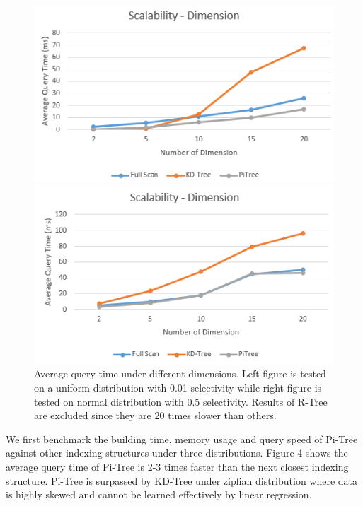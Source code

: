 \documentclass[sigconf,10pt]{acmart}
\begin{document}
\begin{figure}[t] 
  \label{scalability-dimension} 
  \begin{minipage}[b]{0.45\linewidth}
    \centering
    \includegraphics[width=.8\linewidth]{../figures/scalability/dimension-random} 
    \vspace{4ex}
  \end{minipage}%
  \begin{minipage}[b]{0.45\linewidth}
    \centering
    \includegraphics[width=.8\linewidth]{../figures/scalability/dimension-normal} 
    \vspace{4ex}
  \end{minipage}%
  \caption{Average query time under different dimensions. Left figure is tested
  on a uniform distribution with 0.01 selectivity while right figure is tested on normal distribution
  with 0.5 selectivity.
  Results of R-Tree are excluded since they are 20 times slower than others.}
\end{figure}

We first benchmark the building time, memory usage and query speed of Pi-Tree against
other indexing structures under three distributions. Figure 4 shows the average query time of
Pi-Tree is 2-3 times faster than the next closest indexing structure. Pi-Tree is surpassed by
KD-Tree under zipfian distribution where data is highly skewed and cannot be learned effectively
by linear regression.
\end{document}

